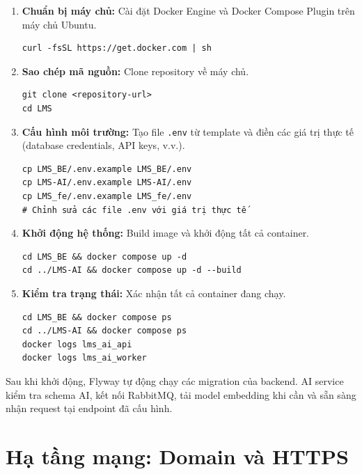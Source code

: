 \begin{enumerate}
    \item \textbf{Chuẩn bị máy chủ:} Cài đặt Docker Engine và Docker Compose
          Plugin trên máy chủ Ubuntu.

    \begin{verbatim}
curl -fsSL https://get.docker.com | sh
    \end{verbatim}

    \item \textbf{Sao chép mã nguồn:} Clone repository về máy chủ.

    \begin{verbatim}
git clone <repository-url>
cd LMS
    \end{verbatim}

    \item \textbf{Cấu hình môi trường:} Tạo file \texttt{.env} từ template và
          điền các giá trị thực tế (database credentials, API keys, v.v.).

    \begin{verbatim}
cp LMS_BE/.env.example LMS_BE/.env
cp LMS-AI/.env.example LMS-AI/.env
cp LMS_fe/.env.example LMS_fe/.env
# Chỉnh sửa các file .env với giá trị thực tế
    \end{verbatim}

    \item \textbf{Khởi động hệ thống:} Build image và khởi động tất cả container.

    \begin{verbatim}
cd LMS_BE && docker compose up -d
cd ../LMS-AI && docker compose up -d --build
    \end{verbatim}

    \item \textbf{Kiểm tra trạng thái:} Xác nhận tất cả container đang chạy.

    \begin{verbatim}
cd LMS_BE && docker compose ps
cd ../LMS-AI && docker compose ps
docker logs lms_ai_api
docker logs lms_ai_worker
    \end{verbatim}
\end{enumerate}

Sau khi khởi động, Flyway tự động chạy các migration của backend. AI service
kiểm tra schema AI, kết nối RabbitMQ, tải model embedding khi cần và sẵn sàng
nhận request tại endpoint đã cấu hình.

\section{Hạ tầng mạng: Domain và HTTPS}

